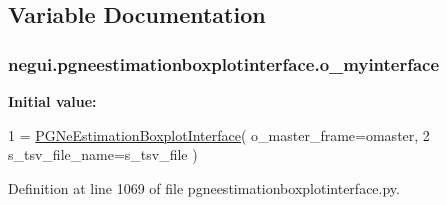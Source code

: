 \subsection{Variable Documentation}
\subsubsection[{\texorpdfstring{o\+\_\+myinterface}{o_myinterface}}]{\setlength{\rightskip}{0pt plus 5cm}negui.\+pgneestimationboxplotinterface.\+o\+\_\+myinterface}\hypertarget{namespacenegui_1_1pgneestimationboxplotinterface_a45b531c1707fd0e1cdfea06d15345d52}{}\label{namespacenegui_1_1pgneestimationboxplotinterface_a45b531c1707fd0e1cdfea06d15345d52}
{\bfseries Initial value\+:}
\begin{DoxyCode}
1 = \hyperlink{classnegui_1_1pgneestimationboxplotinterface_1_1PGNeEstimationBoxplotInterface}{PGNeEstimationBoxplotInterface}( o\_master\_frame=omaster,
2                                                     s\_tsv\_file\_name=s\_tsv\_file )
\end{DoxyCode}


Definition at line 1069 of file pgneestimationboxplotinterface.\+py.

